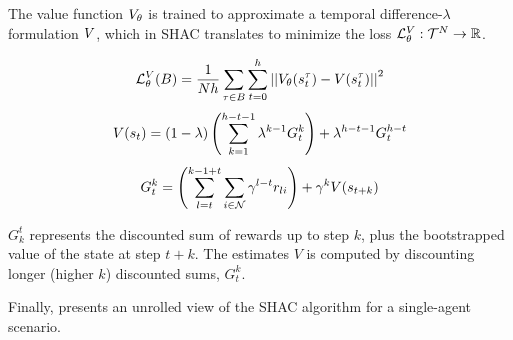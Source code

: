 The value function $V_\theta$ is trained to approximate a temporal difference-$\lambda$ formulation \cite{Sutton98} $V$, which in SHAC translates to minimize the loss $\mathcal{L}_\theta^{V}:\mathcal{T}^N\rightarrow\mathbb{R}$.

$$ \mathcal{L}_\theta^V(B)=\frac{1}{Nh}\sum_{\tau\in B}\sum_{t=0}^h\left|\left| V_\theta(s^\tau_t) - V(s^\tau_t) \right|\right|^2 $$
$$ V(s_t) = (1-\lambda) \left(\sum_{k=1}^{h-t-1}\lambda^{k-1}G_t^k\right) + \lambda^{h-t-1}G_t^{h-t}$$
$$ G_t^k = \left(\sum_{l=t}^{k-1+t}\sum_{i\in\mathcal{N}}\gamma^{l-t} r_{li}\right) + \gamma^k V(s_{t+k})$$

$G^t_k$ represents the discounted sum of rewards up to step $k$, plus the bootstrapped value of the state at step $t+k$. The estimates $V$ is computed by discounting longer (higher $k$) discounted sums, $G^k_t$.

Finally,  presents an unrolled view of the SHAC algorithm for a single-agent scenario.
